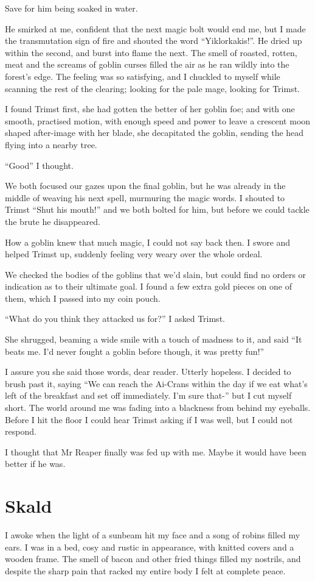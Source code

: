 \documentclass[12pt, a4paper]{book}
\begin{document}
Save for him being soaked in water. 

He smirked at me, confident that the next magic bolt would end me, but I made the transmutation sign of fire and shouted the word ``Yiklorkakis!''. He dried up within the second, and burst into flame the next. The smell of roasted, rotten, meat and the screams of goblin curses filled the air as he ran wildly into the forest's edge. The feeling was so satisfying, and I chuckled to myself while scanning the rest of the clearing; looking for the pale mage, looking for Trimst.

I found Trimst first, she had gotten the better of her goblin foe; and with one smooth, practised motion, with enough speed and power to leave a crescent moon shaped after-image with her blade, she decapitated the goblin, sending the head flying into a nearby tree.

``Good'' I thought.

We both focused our gazes upon the final goblin, but he was already in the middle of weaving his next spell, murmuring the magic words. I shouted to Trimst ``Shut his mouth!'' and we both bolted for him, but before we could tackle the brute he disappeared. 

How a goblin knew that much magic, I could not say back then. I swore and helped Trimst up, suddenly feeling very weary over the whole ordeal.

We checked the bodies of the goblins that we'd slain, but could find no orders or indication as to their ultimate goal. I found a few extra gold pieces on one of them, which I passed into my coin pouch.

``What do you think they attacked us for?'' I asked Trimst.

She shrugged, beaming a wide smile with a touch of madness to it, and said ``It beats me. I'd never fought a goblin before though, it was pretty fun!''

I assure you she said those words, dear reader. Utterly hopeless. I decided to brush past it, saying ``We can reach the Ai-Crans within the day if we eat what's left of the breakfast and set off immediately. I'm sure that-'' but I cut myself short. The world around me was fading into a blackness from behind my eyeballs. Before I hit the floor I could hear Trimst asking if I was well, but I could not respond.

I thought that Mr Reaper finally was fed up with me. Maybe it would have been better if he was.

\chapter{Skald}
I awoke when the light of a sunbeam hit my face and a song of robins filled my ears. I was in a bed, cosy and rustic in appearance, with knitted covers and a wooden frame. The smell of bacon and other fried things filled my nostrils, and despite the sharp pain that racked my entire body I felt at complete peace.
\end{document}
